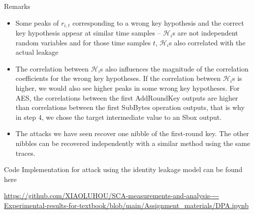 \begin{frame}{Remarks}
    \begin{itemize}
        \item Some peaks of $r_{i,t}$ corresponding to a wrong key hypothesis and the correct key hypothesis appear at similar time samples -- $\mathcal{H}_i$s are not independent random variables and for those time samples $t$, $\mathcal{H}_i$s also correlated with the actual leakage
        \item The correlation between $\mathcal{H}_i$s also influences the magnitude of the correlation coefficients for the wrong key hypotheses.
        If the correlation between $\mathcal{H}_i$s is higher, we would also see higher peaks in some wrong key hypotheses.
        For AES, the correlations between the first AddRoundKey outputs are higher than correlations between the first SubBytes operation outputs, that is why in step 4, we chose the target intermediate value to an Sbox output.
        \item The attacks we have seen recover one nibble of the first-round key.
        The other nibbles can be recovered independently with a similar method using the same traces.
    \end{itemize}
\end{frame}

\begin{frame}{Code}
    Implementation for attack using the identity leakage model can be found here
    \begin{center}
        \url{https://github.com/XIAOLUHOU/SCA-measurements-and-analysis----Experimental-results-for-textbook/blob/main/Assignment_materials/DPA.ipynb}
    \end{center}
\end{frame}